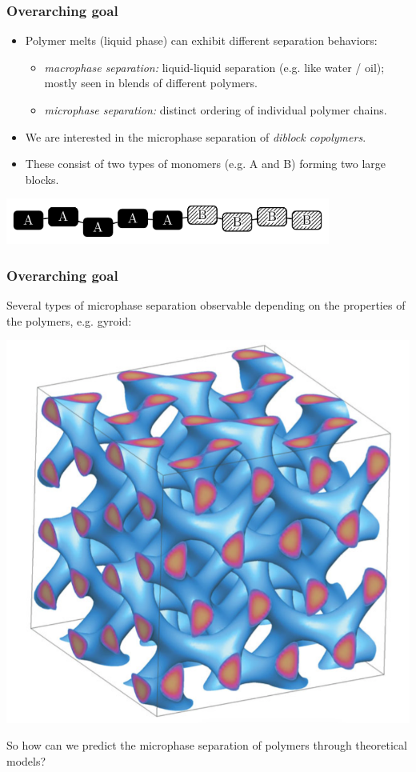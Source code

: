 \begin{frame}[t]
    \frametitle{Overarching goal}

    \vfill

    \begin{itemize}
        \item Polymer melts (liquid phase) can exhibit different separation behaviors:
        \begin{itemize}
            \item \emph{macrophase separation:} liquid-liquid separation (e.g. like water / oil); mostly seen in blends of different polymers.
            \item \emph{microphase separation:} distinct ordering of individual polymer chains.
        \end{itemize}
        \item We are interested in the microphase separation of \emph{diblock copolymers}.
        \item These consist of two types of monomers (e.g. A and B) forming two large blocks.
    \end{itemize}

    \centering
    \includegraphics[width=0.8\textwidth]{figures/copoly2.pdf}
\end{frame}

\begin{frame}[t]
    \frametitle{Overarching goal}

    Several types of microphase separation observable depending on the properties of the polymers, e.g. gyroid:

    \centering
    \includegraphics[scale=0.15]{figures/gyroid_separation.png}

    So how can we predict the microphase separation of polymers through theoretical models?
\end{frame}

